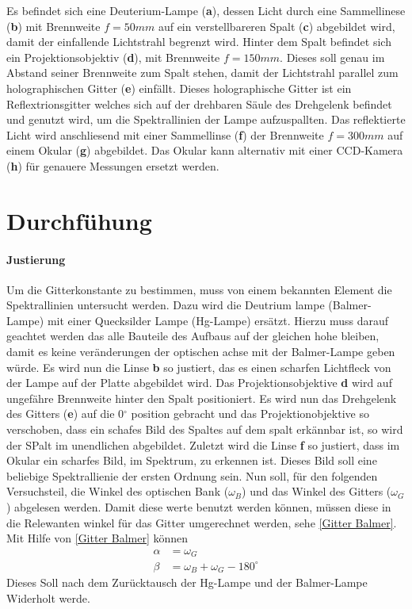Es befindet sich eine Deuterium-Lampe (\textbf{a}), dessen Licht durch eine Sammellinese (\textbf{b}) mit Brennweite $f = 50mm$ auf ein verstellbareren Spalt (\textbf{c}) abgebildet wird, damit der einfallende Lichtstrahl begrenzt wird. 
Hinter dem Spalt befindet sich ein Projektionsobjektiv (\textbf{d}), mit Brennweite $f = 150mm$. 
Dieses soll genau im Abstand seiner Brennweite zum Spalt stehen, damit der Lichtstrahl parallel zum holographischen Gitter (\textbf{e}) einfällt. 
Dieses holographische Gitter ist ein Reflextrionsgitter welches sich auf der drehbaren Säule des Drehgelenk befindet und genutzt wird, um die Spektrallinien der Lampe aufzuspallten. 
Das reflektierte Licht wird anschliesend mit einer Sammellinse (\textbf{f}) der Brennweite $f=300mm$ auf einem Okular (\textbf{g}) abgebildet.
Das Okular kann alternativ mit einer CCD-Kamera (\textbf{h}) für genauere Messungen ersetzt werden.

\section{Durchfühung}

\paragraph{Justierung}

Um die Gitterkonstante zu bestimmen, muss von einem bekannten Element die Spektrallinien untersucht werden. 
Dazu wird die Deutrium lampe (Balmer-Lampe) mit einer Quecksilder Lampe (Hg-Lampe) ersätzt. 
Hierzu muss darauf geachtet werden das alle Bauteile des Aufbaus auf der gleichen hohe bleiben, damit es keine veränderungen der optischen achse mit der Balmer-Lampe geben würde.
Es wird nun die Linse \textbf{b} so justiert, das es einen scharfen Lichtfleck von der Lampe auf der Platte abgebildet wird.
Das Projektionsobjektive \textbf{d} wird auf ungefähre Brennweite hinter den Spalt positioniert. 
Es wird nun das Drehgelenk des Gitters (\textbf{e}) auf die 0$^\circ$ position gebracht und das Projektionobjektive so verschoben, dass ein schafes Bild des Spaltes auf dem spalt erkännbar ist, so wird der SPalt im unendlichen abgebildet.
Zuletzt wird die Linse \textbf{f} so justiert, dass im Okular ein scharfes Bild, im Spektrum, zu erkennen ist. Dieses Bild soll eine beliebige Spektrallienie der ersten Ordnung sein.
Nun soll, für den folgenden Versuchsteil, die Winkel des optischen Bank ($\omega_B$) und das Winkel des Gitters ($\omega_G$) abgelesen werden.  
Damit diese werte benutzt werden können, müssen diese in die Relewanten winkel für das Gitter umgerechnet werden, sehe \cref{Gitter Balmer}. 
Mit Hilfe von \cref{Gitter Balmer} können 
\begin{align}
    \alpha &= \omega_G \\  \beta &= \omega_B + \omega_G - 180^\circ 
    \label{Gitter Balmer}
\end{align}
Dieses Soll nach dem Zurücktausch der Hg-Lampe und der Balmer-Lampe Widerholt werde. 


